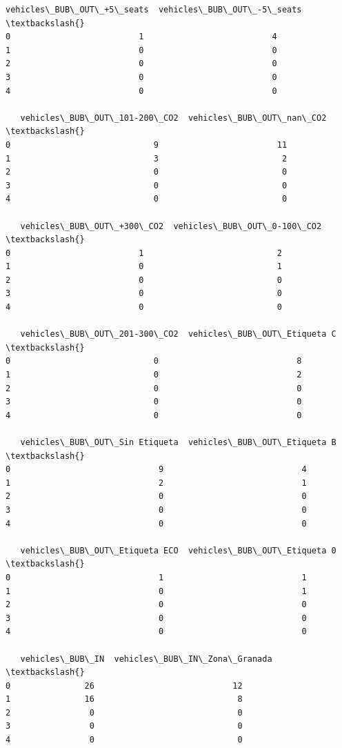 \documentclass[11pt]{article}
\begin{document}
\begin{tcolorbox}[breakable, size=fbox, boxrule=.5pt, pad at break*=1mm, opacityfill=0]
\begin{Verbatim}[commandchars=\\\{\}]
   vehicles\_BUB\_OUT\_+5\_seats  vehicles\_BUB\_OUT\_-5\_seats  \textbackslash{}
0                          1                          4
1                          0                          0
2                          0                          0
3                          0                          0
4                          0                          0

   vehicles\_BUB\_OUT\_101-200\_CO2  vehicles\_BUB\_OUT\_nan\_CO2  \textbackslash{}
0                             9                        11
1                             3                         2
2                             0                         0
3                             0                         0
4                             0                         0

   vehicles\_BUB\_OUT\_+300\_CO2  vehicles\_BUB\_OUT\_0-100\_CO2  \textbackslash{}
0                          1                           2
1                          0                           1
2                          0                           0
3                          0                           0
4                          0                           0

   vehicles\_BUB\_OUT\_201-300\_CO2  vehicles\_BUB\_OUT\_Etiqueta C  \textbackslash{}
0                             0                            8
1                             0                            2
2                             0                            0
3                             0                            0
4                             0                            0

   vehicles\_BUB\_OUT\_Sin Etiqueta  vehicles\_BUB\_OUT\_Etiqueta B  \textbackslash{}
0                              9                            4
1                              2                            1
2                              0                            0
3                              0                            0
4                              0                            0

   vehicles\_BUB\_OUT\_Etiqueta ECO  vehicles\_BUB\_OUT\_Etiqueta 0  \textbackslash{}
0                              1                            1
1                              0                            1
2                              0                            0
3                              0                            0
4                              0                            0

   vehicles\_BUB\_IN  vehicles\_BUB\_IN\_Zona\_Granada  \textbackslash{}
0               26                            12
1               16                             8
2                0                             0
3                0                             0
4                0                             0


\end{Verbatim}
\end{tcolorbox}
\end{document}
